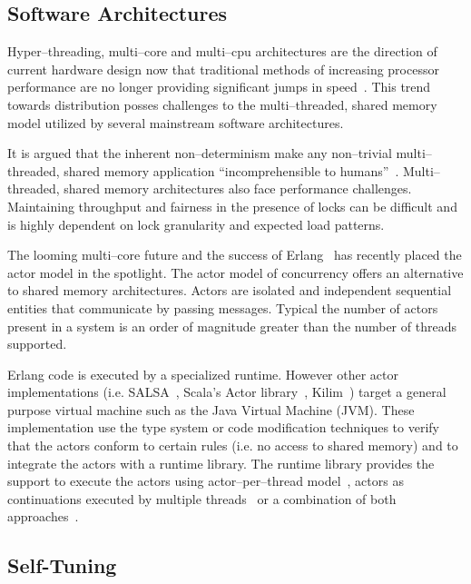 \documentclass[conference]{IEEEtran}
\begin{document}
\subsection{Software Architectures}

Hyper--threading, multi--core and multi--cpu architectures are the direction of current hardware design now that traditional methods of increasing processor performance are no longer providing significant jumps in speed~\cite{Sutter05Concurrency}. This trend towards distribution posses challenges to the multi--threaded, shared memory model utilized by several mainstream software architectures.

It is argued that  the inherent non--determinism make any non--trivial multi--threaded, shared memory application ``incomprehensible to humans''~\cite{Lee06ThreadProblems}. Multi--threaded, shared memory architectures also face performance challenges. Maintaining throughput and fairness in the presence of locks can be difficult and is highly dependent on lock granularity and expected load patterns.

The looming multi--core future and the success of Erlang~\cite{Armstrong96Concurrent} has recently placed the actor model in the spotlight. The actor model of concurrency offers an alternative to shared memory architectures. Actors are isolated and independent sequential entities that communicate by passing messages. Typical the number of actors present in a system is an order of magnitude greater than the number of threads supported.

Erlang code is executed by a specialized runtime. However other actor implementations (i.e. SALSA~\cite{Varela:SALSA}, Scala's Actor library~\cite{Haller:07:ScalaActors}, Kilim~\cite{Srinivasan:08:Kilim}) target a general purpose virtual machine such as the Java Virtual Machine (JVM). These implementation use the type system or code modification techniques to verify that the actors conform to certain rules (i.e. no access to shared memory) and to integrate the actors with a runtime library. The runtime library provides the support to execute the actors using actor--per--thread model~\cite{Varela:SALSA}, actors as continuations executed by multiple threads~\cite{Srinivasan:08:Kilim} or a combination of both approaches~\cite{Haller:07:ScalaActors}.

\subsection{Self-Tuning}
\end{document}
